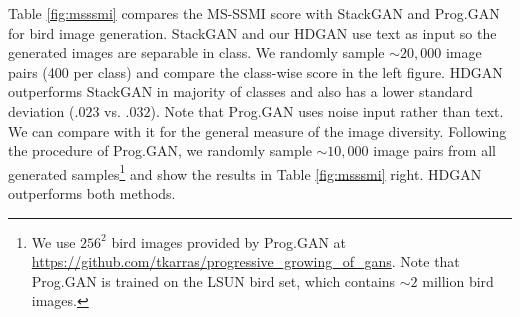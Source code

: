 \documentclass[10pt,twocolumn,letterpaper]{article}
\begin{document}
Table \ref{fig:msssmi} compares the MS-SSMI score with StackGAN and Prog.GAN for bird image generation. StackGAN and our HDGAN use text as input so the generated images are separable in class. We randomly sample ${\sim}20,000$ image pairs (400 per class) and compare the class-wise score in the left figure. HDGAN outperforms StackGAN in majority of classes and also has a lower standard deviation ($.023$ vs. $.032$).
Note that Prog.GAN uses noise input rather than text. We can compare with it for the general measure of the image diversity. Following the procedure of Prog.GAN, we randomly sample ${\sim}10,000$ image pairs from all generated samples\footnote{We use $256^2$ bird images provided by Prog.GAN at \url{https://github.com/tkarras/progressive_growing_of_gans}. Note that Prog.GAN is trained on the LSUN \cite{yu2015lsun} bird set, which contains ${\sim}2$ million bird images.} and show the results in Table \ref{fig:msssmi} right. HDGAN outperforms both methods. 
\end{document}
